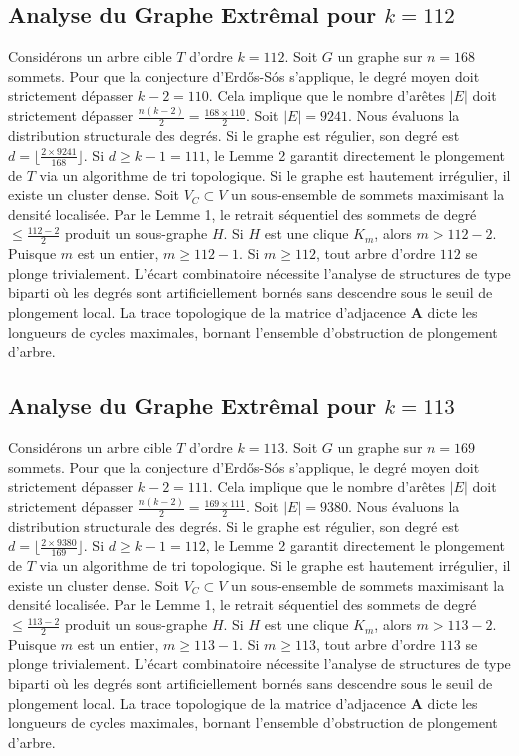 \documentclass[11pt,a4paper]{article}
\begin{document}
\subsection{Analyse du Graphe Extr\^emal pour $k=112$}
Consid\'erons un arbre cible $T$ d'ordre $k=112$.
Soit $G$ un graphe sur $n=168$ sommets.
Pour que la conjecture d'Erd\H{o}s-S\'os s'applique, le degr\'e moyen doit strictement d\'epasser $k-2 = 110$.
Cela implique que le nombre d'ar\^etes $|E|$ doit strictement d\'epasser $\frac{n(k-2)}{2} = \frac{168 \times 110}{2}$.
Soit $|E| = 9241$.
Nous \'evaluons la distribution structurale des degr\'es. Si le graphe est r\'egulier, son degr\'e est $d = \lfloor \frac{2 \times 9241}{168} \rfloor$.
Si $d \geq k-1 = 111$, le Lemme 2 garantit directement le plongement de $T$ via un algorithme de tri topologique.
Si le graphe est hautement irr\'egulier, il existe un cluster dense. Soit $V_C \subset V$ un sous-ensemble de sommets maximisant la densit\'e localis\'ee.
Par le Lemme 1, le retrait s\'equentiel des sommets de degr\'e $\leq \frac{112-2}{2}$ produit un sous-graphe $H$.
Si $H$ est une clique $K_{m}$, alors $m > 112-2$. Puisque $m$ est un entier, $m \geq 112-1$. Si $m \geq 112$, tout arbre d'ordre $112$ se plonge trivialement.
L'\'ecart combinatoire n\'ecessite l'analyse de structures de type biparti o\`u les degr\'es sont artificiellement born\'es sans descendre sous le seuil de plongement local. La trace topologique de la matrice d'adjacence $\mathbf{A}$ dicte les longueurs de cycles maximales, bornant l'ensemble d'obstruction de plongement d'arbre.


\subsection{Analyse du Graphe Extr\^emal pour $k=113$}
Consid\'erons un arbre cible $T$ d'ordre $k=113$.
Soit $G$ un graphe sur $n=169$ sommets.
Pour que la conjecture d'Erd\H{o}s-S\'os s'applique, le degr\'e moyen doit strictement d\'epasser $k-2 = 111$.
Cela implique que le nombre d'ar\^etes $|E|$ doit strictement d\'epasser $\frac{n(k-2)}{2} = \frac{169 \times 111}{2}$.
Soit $|E| = 9380$.
Nous \'evaluons la distribution structurale des degr\'es. Si le graphe est r\'egulier, son degr\'e est $d = \lfloor \frac{2 \times 9380}{169} \rfloor$.
Si $d \geq k-1 = 112$, le Lemme 2 garantit directement le plongement de $T$ via un algorithme de tri topologique.
Si le graphe est hautement irr\'egulier, il existe un cluster dense. Soit $V_C \subset V$ un sous-ensemble de sommets maximisant la densit\'e localis\'ee.
Par le Lemme 1, le retrait s\'equentiel des sommets de degr\'e $\leq \frac{113-2}{2}$ produit un sous-graphe $H$.
Si $H$ est une clique $K_{m}$, alors $m > 113-2$. Puisque $m$ est un entier, $m \geq 113-1$. Si $m \geq 113$, tout arbre d'ordre $113$ se plonge trivialement.
L'\'ecart combinatoire n\'ecessite l'analyse de structures de type biparti o\`u les degr\'es sont artificiellement born\'es sans descendre sous le seuil de plongement local. La trace topologique de la matrice d'adjacence $\mathbf{A}$ dicte les longueurs de cycles maximales, bornant l'ensemble d'obstruction de plongement d'arbre.
\end{document}
